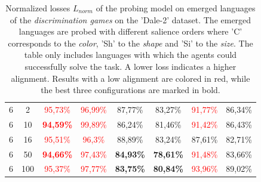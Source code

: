 \begin{table}[ht]
\begin{tabular}{cc|c|c|c|c|c|c}
        {6} & {2}   & \textcolor{red}{95,73\%}          & \textcolor{red}{96,99\%}          & {87,77\%}                & {83,27\%}                & \textcolor{red}{91,77\%} & {86,34\%}                \\
        {6} & {10}  & \textcolor{red}{\textbf{94,59\%}} & \textcolor{red}{99,89\%}          & {86,24\%}                & {81,46\%}                & \textcolor{red}{91,42\%} & {86,43\%}                \\
        {6} & {16}  & \textcolor{red}{95,51\%}          & \textcolor{red}{96,3\%}           & {88,89\%}                & {83,24\%}                & {87,61\%}                & {82,71\%}                \\
        {6} & {50}  & \textcolor{red}{\textbf{94,66\%}} & \textcolor{red}{97,43\%}          & \textbf{84,93\%}         & \textbf{78,61\%}         & \textcolor{red}{91,48\%} & {83,66\%}                \\
        {6} & {100} & \textcolor{red}{95,37\%}          & \textcolor{red}{97,77\%}          & \textbf{83,75\%}         & \textbf{80,84\%}         & \textcolor{red}{93,96\%} & {89,02\%}                \\
        \bottomrule
    \end{tabular}
    \caption{Normalized losses $L_{norm}$ of the probing model on emerged languages of the \emph{discrimination games} on the 'Dale-2' dataset. The emerged languages are probed with different salience orders where 'C' corresponds to the \emph{color}, 'Sh' to the \emph{shape} and 'Si' to the \emph{size}. The table only includes languages with which the agents could successfully solve the task. A lower loss indicates a higher alignment. Results with a low alignment are colored in red, while the best three configurations are marked in bold.}
    \label{tab:probing:discriminator:dale-2}
\end{table}

